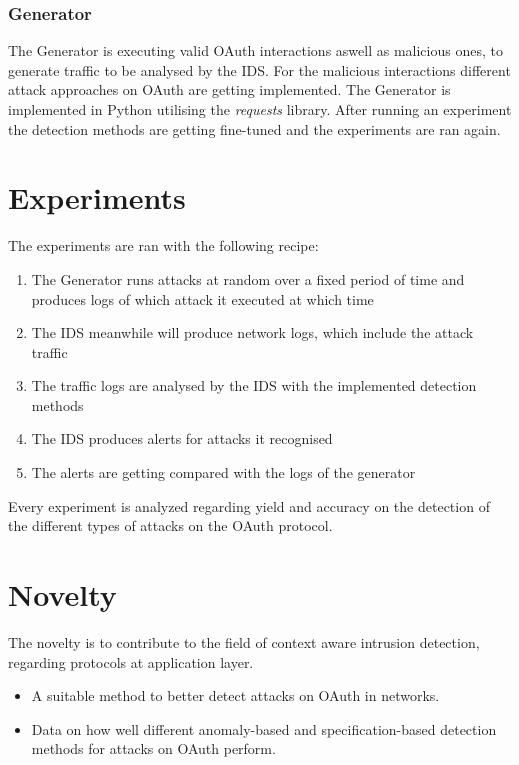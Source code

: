 \documentclass{article}
\begin{document}
\subsubsection{Generator}
The Generator is executing valid OAuth interactions aswell as malicious ones, to generate traffic to be analysed by the IDS. For the malicious interactions different attack approaches on OAuth are getting implemented. The Generator is implemented in Python utilising the \emph{requests} library. After running an experiment the detection methods are getting fine-tuned and the experiments are ran again.


\section{Experiments}
The experiments are ran with the following recipe:
\begin{enumerate}
    \item The Generator runs attacks at random over a fixed period of time and produces logs of which attack it executed at which time
    \item The IDS meanwhile will produce network logs, which include the attack traffic
    \item The traffic logs are analysed by the IDS with the implemented detection methods
    \item The IDS produces alerts for attacks it recognised
    \item The alerts are getting compared with the logs of the generator
\end{enumerate}

Every experiment is analyzed regarding yield and accuracy on the detection of the different types of attacks on the OAuth protocol.

\section{Novelty}

The novelty is to contribute to the field of context aware intrusion detection, regarding protocols at application layer.
\begin{itemize}
    \item A suitable method to better detect attacks on OAuth in networks.
    \item Data on how well different anomaly-based and specification-based detection methods for attacks on OAuth perform.
\end{itemize}



\end{document}
